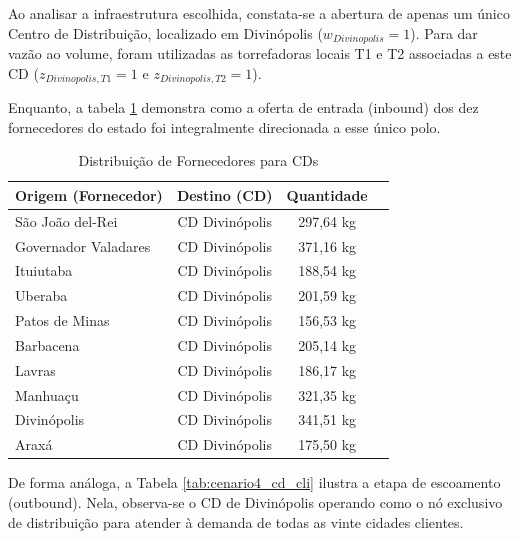 \documentclass[a4paper,11pt]{article}
\begin{document}
Ao analisar a infraestrutura escolhida, constata-se a abertura de apenas um único Centro de Distribuição, localizado em Divinópolis ($w_{Divinopolis} = 1$). Para dar vazão ao volume, foram utilizadas as torrefadoras locais T1 e T2 associadas a este CD ($z_{Divinopolis, T1} = 1$ e $z_{Divinopolis, T2} = 1$). 

Enquanto, a tabela \ref{tab:cenario4_forn_cd} demonstra como a oferta de entrada (inbound) dos dez fornecedores do estado foi integralmente direcionada a esse único polo.

\begin{table}[H]
\centering
\begin{tabular}{lccc}
\hline
\textbf{Origem (Fornecedor)} & \textbf{Destino (CD)} & \textbf{Quantidade} \\ \hline
São João del-Rei        & CD Divinópolis    & 297,64 kg     \\
Governador Valadares    & CD Divinópolis    & 371,16 kg  \\
Ituiutaba               & CD Divinópolis    & 188,54 kg  \\
Uberaba                 & CD Divinópolis    & 201,59 kg  \\
Patos de Minas          & CD Divinópolis    & 156,53 kg  \\
Barbacena               & CD Divinópolis    & 205,14 kg \\
Lavras                  & CD Divinópolis    & 186,17 kg \\
Manhuaçu                & CD Divinópolis    & 321,35 kg  \\
Divinópolis             & CD Divinópolis    & 341,51 kg  \\
Araxá                   & CD Divinópolis    & 175,50 kg  \\
\hline
\end{tabular}
\caption{Distribuição de Fornecedores para CDs}
\label{tab:cenario4_forn_cd}
\end{table}

De forma análoga, a Tabela \ref{tab:cenario4_cd_cli} ilustra a etapa de escoamento (outbound). Nela, observa-se o CD de Divinópolis operando como o nó exclusivo de distribuição para atender à demanda de todas as vinte cidades clientes.
\end{document}
